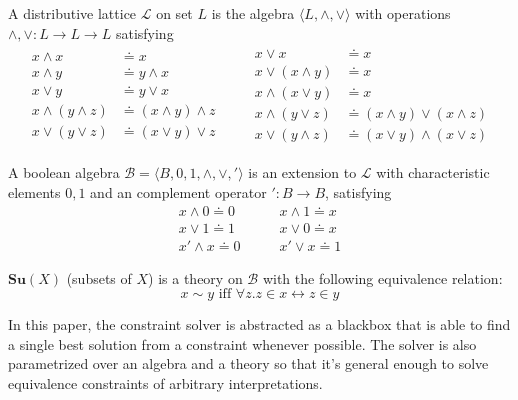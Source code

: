 \begin{exa}
  A distributive lattice $\mathcal{L}$ on set $L$ is the algebra $\langle L,
  \land, \vee \rangle$ with operations $\land, \vee : L \to L \to L$ satisfying
  \begin{gather*}
    \begin{aligned}
      x \land x & \doteq x\\
      x \land y & \doteq y \land x\\
      x \vee y  & \doteq y \vee x\\
      x \land (y \land z) & \doteq (x \land y) \land z\\
      x \vee (y \vee z) & \doteq (x \vee y) \vee z
    \end{aligned}
    \qquad
    \begin{aligned}
      x \vee x & \doteq x\\
      x \vee (x \land y) & \doteq x\\
      x \land (x \vee y) & \doteq x\\
      x \land (y \vee z) & \doteq (x \land y) \vee (x \land z)\\
      x \vee (y \land z) & \doteq (x \vee y) \land (x \vee z)
    \end{aligned}
  \end{gather*}

  A boolean algebra $\mathcal{B} = \langle B, 0, 1, \land, \vee, ' \rangle$ is an
  extension to $\mathcal{L}$ with characteristic elements $0,1$ and an complement
  operator $' : B \to B$, satisfying
  \begin{equation*}
    \begin{aligned}
      x \land 0 \doteq 0\\
      x \vee 1 \doteq 1\\
      x' \land x \doteq 0
    \end{aligned}
    \qquad
    \begin{aligned}
      x \land 1 \doteq x\\
      x \vee 0 \doteq x\\
      x' \vee x \doteq 1
    \end{aligned}
  \end{equation*}

  $\textbf{Su}(X)$ (subsets of $X$) is a theory on $\mathcal{B}$ with
  the following equivalence relation:
  \[
    x \sim y \text{ iff } \forall z . z \in x \leftrightarrow z \in y
  \]
\end{exa}

In this paper, the constraint solver is abstracted as a blackbox that is able to
find a single best solution from a constraint whenever possible. The solver is
also parametrized over an algebra and a theory so that it's general enough to
solve equivalence constraints of arbitrary interpretations.\\

